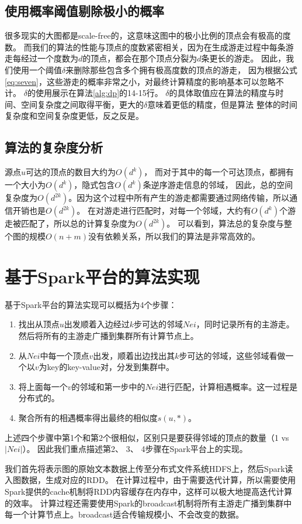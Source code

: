 \documentclass[master]{njuthesis}
\begin{document}
\subsection{使用概率阈值剔除极小的概率}
很多现实的大图都是scale-free\cite{li2005towards}的，这意味这图中的极小比例的顶点会有极高的度数。
而我们的算法的性能与顶点的度数紧密相关，因为在生成游走过程中每条游走每经过一个度数为$d$的顶点，都会在那个顶点分裂为$d$条更长的游走。
因此，我们使用一个阈值\cite{lizorkin2008accuracy}$\delta$来删除那些包含多个拥有极高度数的顶点的游走，
因为根据公式\ref{eq:seven}，这些游走的概率非常之小，对最终计算精度的影响基本可以忽略不计。
$\delta$的使用展示在算法\ref{alg:dp}的14-15行。
$\delta$的具体取值应在算法的精度与时间、空间复杂度之间取得平衡，更大的$\delta$意味着更低的精度，但是算法
整体的时间复杂度和空间复杂度更低，反之反是。
\subsection{算法的复杂度分析}
源点$u$可达的顶点的数目大约为$O(d^k)$，
而对于其中的每一个可达顶点，都拥有一个大小为$O(d^k)$，隐式包含$O(d^k)$条逆序游走信息的邻域，
因此，总的空间复杂度为$O(d^{2k})$。因为这个过程中所有产生的游走都需要通过网络传输，所以通信开销也是$O(d^{2k})$。
在对游走进行匹配时，对每一个邻域，大约有$O(d^k)$个游走被匹配了，所以总的计算复杂度为$O(d^{2k})$。
可以看到，算法总的复杂度与整个图的规模$O(n+m)$没有依赖关系，所以我们的算法是非常高效的。
\section{基于Spark平台的算法实现}
基于Spark平台的算法实现可以概括为4个步骤：
\begin{enumerate}
 \item 找出从顶点$u$出发顺着入边经过$k$步可达的邻域$Nei$，同时记录所有的主游走。然后将所有的主游走广播到集群所有计算节点上。
 \item 从$Nei$中每一个顶点$v$出发，顺着出边找出其$k$步可达的邻域，这些邻域看做一个以$v$为key的key-value对，分发到集群中。
 \item 将上面每一个$v$的邻域和第一步中的$Nei$进行匹配，计算相遇概率。这一过程是分布式的。
 \item 聚合所有的相遇概率得出最终的相似度$s(u,*)$。
\end{enumerate}
上述四个步骤中第1个和第2个很相似，区别只是要获得邻域的顶点的数量（1 vs $|Nei|$）。
因此我们重点描述第2、 3、 4步骤在Spark平台上的实现。

我们首先将表示图的原始文本数据上传至分布式文件系统HDFS上，然后Spark读入图数据，生成对应的RDD。
在计算过程中，由于需要迭代计算，所以需要使用Spark提供的cache机制将RDD内容缓存在内存中，这样可以极大地提高迭代计算的效率。
计算过程还需要使用Spark的broadcast机制将所有主游走广播到集群中每一个计算节点上。broadcast适合传输规模小、不会改变的数据。
\end{document}
